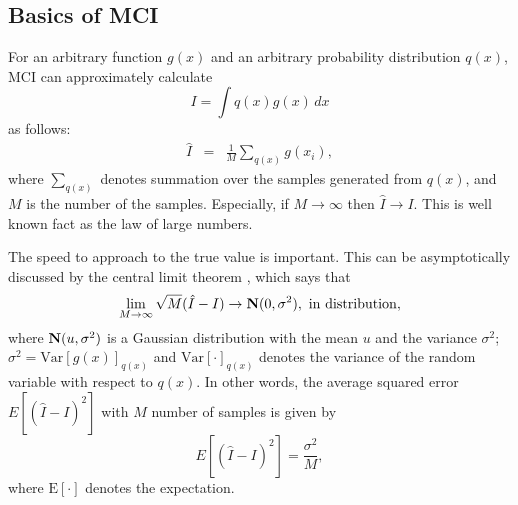 \subsection{Basics of MCI}
For an arbitrary function $g(x)$ and 
an arbitrary probability distribution $q(x)$,
MCI can approximately calculate 
\begin{equation}
 I=\int q(x) g(x) \, dx
\label{eq-integral}
\end{equation}
as follows:
\begin{eqnarray}
 \hat I &=& \frac{1}{M} \sum_{q(x)} g(x_i),
\end{eqnarray}
where $\sum_{q(x)}$ denotes summation over the samples generated from
$q(x)$, and $M$ is the number of the samples.
Especially, if $M \to \infty$ then 
$\hat I \to I$.
This is well known fact as the law of large numbers.

The speed to approach to the true value is
important.
This can be asymptotically discussed by the central limit theorem
\cite{liu:mci},
which says that
\begin{equation}
\lim_{M \to \infty} \sqrt{M}(\hat I - I) \to {\bf N}(0,\sigma^2),
~\mathrm{in ~ distribution},
\end{equation}
where ${\bf N}(u,\sigma^2)$ is a Gaussian distribution with
the mean $u$ and the variance $\sigma^2$;
$\sigma^2=\mathrm{Var}[g(x)]_{q(x)}$ and
$\mathrm{Var}[\cdot]_{q(x)}$ denotes the variance of the random variable 
with respect to $q(x)$.
In other words, the average squared error $E[(\hat I -I)^2]$ with $M$
number of samples is given by
\begin{equation}
 E[(\hat I -I)^2]=\frac{\sigma^2}{M},
 \label{eq_mci_error}
\end{equation}
where $\mathrm{E}[\cdot]$ denotes the expectation.



